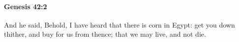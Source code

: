 
		\paragraph{Genesis 42:2} %
			\label{GENESIS-42-2}

			And he said, Behold, I have heard that there is corn in Egypt: get you down thither, and buy for us from thence; that we may live, and not die.


